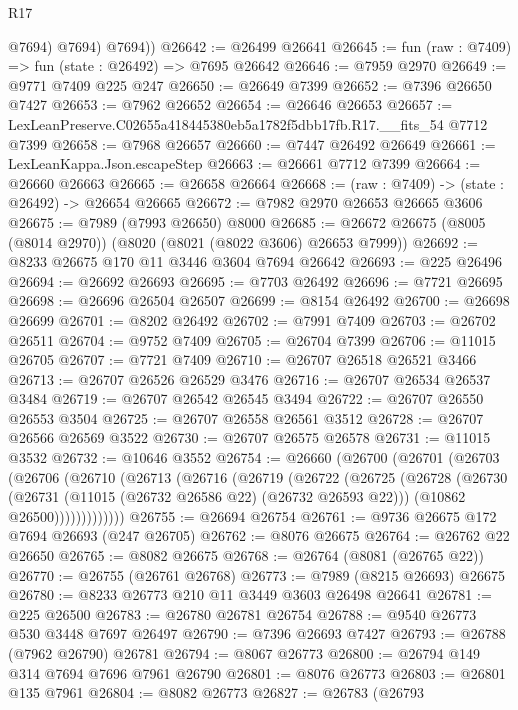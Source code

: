 \begin{lexlean}{R17}
\begin{coremodule}
            @7694)
          @7694)
        @7694))
@26642 := @26499 @26641
@26645 := fun (raw : @7409) => fun (state : @26492) => @7695 @26642
@26646 := @7959 @2970
@26649 := @9771 @7409 @225 @247
@26650 := @26649 @7399
@26652 := @7396 @26650 @7427
@26653 := @7962 @26652
@26654 := @26646 @26653
@26657 := LexLeanPreserve.C02655a418445380eb5a1782f5dbb17fb.R17.__fits_54 @7712 @7399
@26658 := @7968 @26657
@26660 := @7447 @26492 @26649
@26661 := LexLeanKappa.Json.escapeStep
@26663 := @26661 @7712 @7399
@26664 := @26660 @26663
@26665 := @26658 @26664
@26668 := (raw : @7409) -> (state : @26492) -> @26654 @26665
@26672 := @7982 @2970 @26653 @26665 @3606
@26675 := @7989 (@7993 @26650) @8000
@26685 := @26672 @26675 (@8005 (@8014 @2970)) (@8020 (@8021 (@8022 @3606) @26653 @7999))
@26692 := @8233 @26675 @170 @11 @3446 @3604 @7694 @26642
@26693 := @225 @26496
@26694 := @26692 @26693
@26695 := @7703 @26492
@26696 := @7721 @26695
@26698 := @26696 @26504 @26507
@26699 := @8154 @26492
@26700 := @26698 @26699
@26701 := @8202 @26492
@26702 := @7991 @7409
@26703 := @26702 @26511
@26704 := @9752 @7409
@26705 := @26704 @7399
@26706 := @11015 @26705
@26707 := @7721 @7409
@26710 := @26707 @26518 @26521 @3466
@26713 := @26707 @26526 @26529 @3476
@26716 := @26707 @26534 @26537 @3484
@26719 := @26707 @26542 @26545 @3494
@26722 := @26707 @26550 @26553 @3504
@26725 := @26707 @26558 @26561 @3512
@26728 := @26707 @26566 @26569 @3522
@26730 := @26707 @26575 @26578
@26731 := @11015 @3532
@26732 := @10646 @3552
@26754 := @26660
    (@26700
      (@26701
        (@26703
          (@26706
            (@26710
              (@26713
                (@26716
                  (@26719
                    (@26722
                      (@26725
                        (@26728
                          (@26730
                            (@26731 (@11015 (@26732 @26586 @22) (@26732 @26593 @22)))
                            (@10862 @26500)))))))))))))
@26755 := @26694 @26754
@26761 := @9736 @26675 @172 @7694 @26693 (@247 @26705)
@26762 := @8076 @26675
@26764 := @26762 @22 @26650
@26765 := @8082 @26675
@26768 := @26764 (@8081 (@26765 @22))
@26770 := @26755 (@26761 @26768)
@26773 := @7989 (@8215 @26693) @26675
@26780 := @8233 @26773 @210 @11 @3449 @3603 @26498 @26641
@26781 := @225 @26500
@26783 := @26780 @26781 @26754
@26788 := @9540 @26773 @530 @3448 @7697 @26497
@26790 := @7396 @26693 @7427
@26793 := @26788 (@7962 @26790) @26781
@26794 := @8067 @26773
@26800 := @26794 @149 @314 @7694 @7696 @7961 @26790
@26801 := @8076 @26773
@26803 := @26801 @135 @7961
@26804 := @8082 @26773
@26827 := @26783
    (@26793

\end{coremodule}
\end{lexlean}
